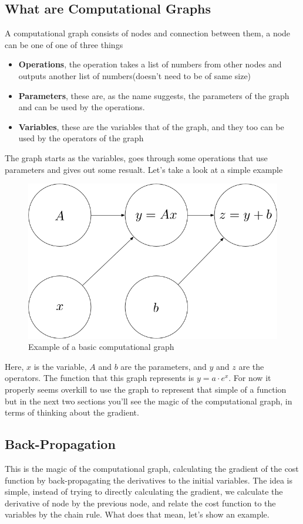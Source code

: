 \documentclass[english, a4paper, 12pt, twoside]{article}
\numberwithin{equation}{section} %
\begin{document}
\subsection{What are Computational Graphs}
A computational graph consists of nodes and connection between them, a node can be one of one of three things
\begin{itemize}
    \item \textbf{Operations}, the operation takes a list of numbers from other nodes and outputs another list of numbers(doesn't need to be of same size) %
    \item \textbf{Parameters}, these are, as the name suggests, the parameters of the graph and can be used by the operations.
    \item \textbf{Variables}, these are the variables that of the graph, and they too can be used by the operators of the graph
\end{itemize}
The graph starts as the variables, goes through some operations that use parameters and gives out some resualt. Let's take a look at a simple example
\begin{figure}[H]
    \centering
    \includegraphics[width=0.4\columnwidth]{Example-comp-graph.png} %
    \caption{Example of a basic computational graph}
    \label{fig:example-computational-graph}
\end{figure}

Here, $x$ is the variable, $A$ and $b$ are the parameters, and $y$ and $z$ are the operators. The function that this graph represents is $y = a \cdot e^{x}$. For now it properly seems overkill to use the graph to represent that simple of a function but in the next two sections you'll see the magic of the computational graph, in terms of thinking about the gradient.

\subsection{Back-Propagation}
This is the magic of the computational graph, calculating the gradient of the cost function by back-propagating the derivatives to the initial variables. The idea is simple, instead of trying to directly calculating the gradient, we calculate the derivative of node by the previous node, and relate the cost function to the variables by the chain rule. What does that mean, let's show an example.
\end{document}

